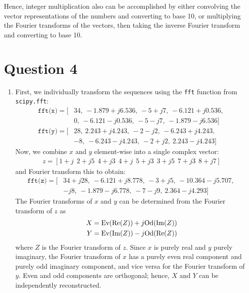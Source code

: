 \documentclass[a4paper, 11pt]{article}
\begin{document}
Hence, integer multiplication also can be accomplished by either convolving the
vector representations of the numbers and converting to base 10, or multiplying
the Fourier transforms of the vectors, then taking the inverse Fourier transform
and converting to base 10.

\newpage
\section*{Question 4}

\begin{enumerate}[label=\alph*)]

    \item First, we individually transform the sequences using the \texttt{fft}
    function from \texttt{scipy.fft}:
    \begin{align*}
        \texttt{fft(x)} = [&34,\ -1.879+j6.536,\ -5+j7,\ -6.121+j0.536,\ \\
                           &0,\ -6.121-j0.536,\ -5-j7,\ -1.879-j6.536] \\
        \texttt{fft(y)} = [&28,\ 2.243+j4.243,\ -2-j2,\ -6.243+j4.243,\ \\
                           &-8,\ -6.243-j4.243,\ -2+j2,\ 2.243-j4.243]
    \end{align*}
    Now, we combine $x$ and $y$ element-wise into a single complex vector:
    \begin{align*}
        z = [1+j\ \ 2+j5\ \ 4+j3\ \ 4+j\ \ 5+j3\ \ 3+j5\ \ 7+j3\ \ 8+j7]
    \end{align*}
    and Fourier transform this to obtain:
    \begin{align*}
        \texttt{fft(z)} = [&34+j28,\ -6.121+j8.778,\ -3+j5,\ -10.364-j5.707,\ \\
                           &-j8,\ -1.879-j6.778,\ -7-j9,\ 2.364-j4.293]
    \end{align*}
    The Fourier transforms of $x$ and $y$ can be determined from the
    Fourier transform of $z$ as
    \begin{align*}
        X &= \text{Ev}(\Re(Z)) + j\text{Od}(\Im(Z)) \\
        Y &= \text{Ev}(\Im(Z)) - j\text{Od}(\Re(Z))
    \end{align*}
    where $Z$ is the Fourier transform of $z$. Since $x$ is purely real and $y$
    purely imaginary, the Fourier transform of $x$ has a purely even real
    component and purely odd imaginary component, and vice versa for the Fourier
    transform of $y$. Even and odd components are orthogonal; hence, $X$ and $Y$
    can be independently reconstructed.


\end{enumerate}
\end{document}
